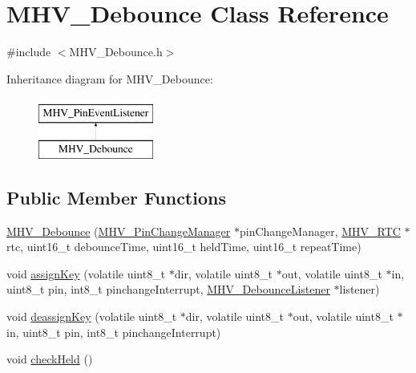 \hypertarget{class_m_h_v___debounce}{
\section{\-M\-H\-V\-\_\-\-Debounce \-Class \-Reference}
\label{class_m_h_v___debounce}
}


{\ttfamily \#include $<$\-M\-H\-V\-\_\-\-Debounce.\-h$>$}

\-Inheritance diagram for \-M\-H\-V\-\_\-\-Debounce\-:\begin{figure}[H]
\begin{center}
\leavevmode
\includegraphics[height=2.000000cm]{class_m_h_v___debounce}
\end{center}
\end{figure}
\subsection*{\-Public \-Member \-Functions}
\begin{DoxyCompactItemize}
\item 
\hyperlink{class_m_h_v___debounce_a011b688e758752447a1b30ad7eae1563}{\-M\-H\-V\-\_\-\-Debounce} (\hyperlink{class_m_h_v___pin_change_manager}{\-M\-H\-V\-\_\-\-Pin\-Change\-Manager} $\ast$pin\-Change\-Manager, \hyperlink{class_m_h_v___r_t_c}{\-M\-H\-V\-\_\-\-R\-T\-C} $\ast$rtc, uint16\-\_\-t debounce\-Time, uint16\-\_\-t held\-Time, uint16\-\_\-t repeat\-Time)
\item 
void \hyperlink{class_m_h_v___debounce_abeae6c521b5998ea395dc70da54b58ec}{assign\-Key} (volatile uint8\-\_\-t $\ast$dir, volatile uint8\-\_\-t $\ast$out, volatile uint8\-\_\-t $\ast$in, uint8\-\_\-t pin, int8\-\_\-t pinchange\-Interrupt, \hyperlink{class_m_h_v___debounce_listener}{\-M\-H\-V\-\_\-\-Debounce\-Listener} $\ast$listener)
\item 
void \hyperlink{class_m_h_v___debounce_a00f8ea47ef5e0b51a9169a162daa7338}{deassign\-Key} (volatile uint8\-\_\-t $\ast$dir, volatile uint8\-\_\-t $\ast$out, volatile uint8\-\_\-t $\ast$in, uint8\-\_\-t pin, int8\-\_\-t pinchange\-Interrupt)
\item 
void \hyperlink{class_m_h_v___debounce_a581f7626d54332eec3e34bb5367e1148}{check\-Held} ()
\end{DoxyCompactItemize}
